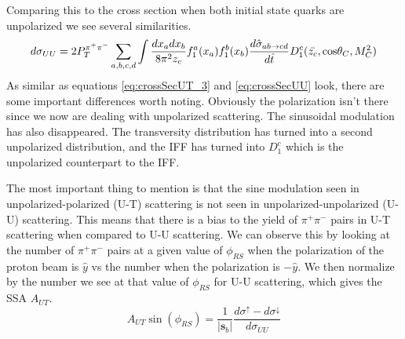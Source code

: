 \documentclass[abstract = on,listof=totoc, bibliography=totoc]{scrreprt}
\newcommand{\phirs}{\phi_{RS}}
\newcommand{\ptpair}{P_{T}^{\pi^+\pi^-}}
\newcommand{\pip}{\pi^+}
\newcommand{\pim}{\pi^-}
\newcommand{\pair}{$\pip\pim$ }
\begin{document}

Comparing this to the cross section when both initial state quarks are unpolarized we see several similarities.
\begin{equation}
\label{eq:crossSecUU}
d\sigma_{UU} = 2 \ptpair \sum_{a,b,c,d} \int \frac{dx_adx_b}{8\pi^2z_c} f_1^a(x_a)f_1^b(x_b) \frac{d\hat{\sigma}_{ab \rightarrow cd}}{d\hat{t}}D_1^c(\bar{z_c},\textnormal{cos}\theta_C,M_C^2)
\end{equation}
As similar as equations \ref{eq:crossSecUT_3} and \ref{eq:crossSecUU} look, there are some important differences worth noting. Obviously the polarization isn't there since we now are dealing with unpolarized scattering. The sinusoidal modulation has also disappeared. The transversity distribution has turned into a second unpolarized distribution, and the IFF has turned into $D_1^c$ which is the unpolarized counterpart to the IFF.   

The most important thing to mention is that the sine modulation seen in unpolarized-polarized (U-T) scattering is not seen in unpolarized-unpolarized (U-U) scattering. This means that there is a bias to the yield of \pair pairs in U-T scattering when compared to U-U scattering. We can observe this by looking at the number of \pair pairs at a given value of $\phirs$ when the polarization of the proton beam is $\hat{y}$ vs the number when the polarization is $-\hat{y}$. We then normalize by the number we see at that value of $\phirs$ for U-U scattering, which gives the SSA $A_{UT}$.
\begin{equation}
\label{eq:asymCS}
A_{UT} \sin (\phirs) =\frac{1}{|\bm{s}_b|} \frac{d\sigma^\uparrow - d\sigma^\downarrow}{d\sigma_{UU}}
\end{equation}
\end{document}
